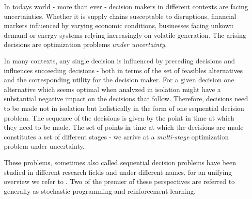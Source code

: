\documentclass[a4paper,12pt]{article}
\begin{document}







In todays world - more than ever - decision makers in different contexts are facing uncertainties. Whether it is supply chains susceptable to disruptions, financial markets influenced by varying economic conditions, businesses facing unkown demand or energy systems relying increasingly on volatile generation.
The arising decisions are optimization problems \emph{under uncertainty}.

In many contexts, any single decision is influenced by preceding decisions and influences succeeding decisions - both in terms of the set of feasibles alternatives and the corresponding utility for the decision maker. For a given decision one alternative which seems optimal when analyzed in isolation might have a substantial negative impact on the decisions that follow. Therefore, decisions need to be made not in isolation but holistically in the form of one sequential decision problem. 
The sequence of the decisions is given by the point in time at which they need to be made. The set of points in time at which the decisions are made constitutes a set of different stages - we arrive at a \emph{multi-stage} optimization problem under uncertainty.

These problems, sometimes also called sequential decision problems have been studied in different research fields and under different names, for an unifying overview we refer to \cite{powell2021reinforcement}. Two of the premier of these perspectives are referred to generally as stochastic programming and reinforcement learning.
\end{document}
